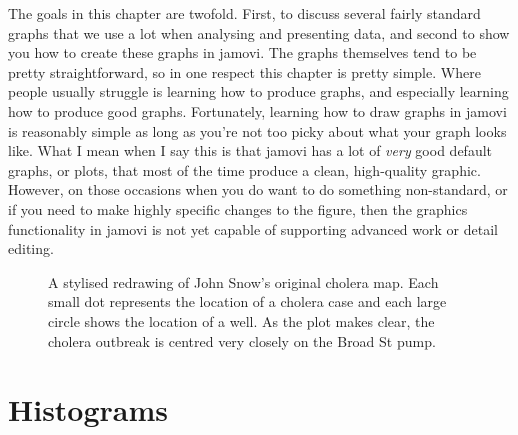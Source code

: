The goals in this chapter are twofold. First, to discuss several fairly standard graphs that we use a lot when analysing and presenting data, and second to show you how to create these graphs in jamovi. The graphs themselves tend to be pretty straightforward, so in one respect this chapter is pretty simple. Where people usually struggle is learning how to produce graphs, and especially learning how to produce good graphs. Fortunately, learning how to draw graphs in jamovi is reasonably simple as long as you're not too picky about what your graph looks like. What I mean when I say this is that jamovi has a lot of {\it very} good default graphs, or plots, that most of the time produce a clean, high-quality graphic. However, on those occasions when you do want to do something non-standard, or if you need to make highly specific changes to the figure, then the graphics functionality in jamovi is not yet capable of supporting advanced work or detail editing. 

\begin{figure}[htb]
\begin{center}
\caption{A stylised redrawing of John Snow's original cholera map. Each small dot represents the location of a cholera case and each large circle shows the location of a well. As the plot makes clear, the cholera outbreak is centred very closely on the Broad St pump.}
\label{fig:snowmap1}
\end{center}
\end{figure}


\section{Histograms\label{sec:hist}}
 
